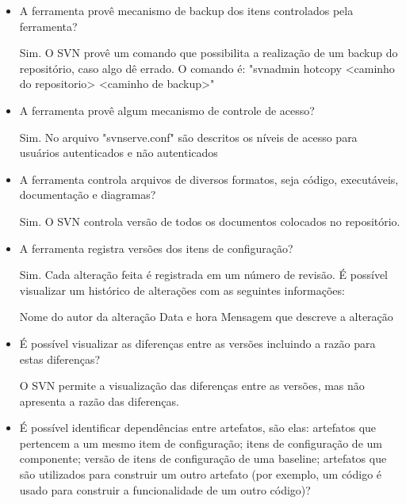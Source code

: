 \begin{itemize}
  \item A ferramenta provê mecanismo de backup dos itens controlados pela ferramenta?

    Sim. O SVN provê um comando que possibilita a realização de um backup do repositório, caso algo dê errado. O comando é:
    "svnadmin hotcopy <caminho do repositorio> <caminho de backup>"

  \item A ferramenta provê algum mecanismo de controle de acesso?
  
    Sim. No arquivo "svnserve.conf" são descritos os níveis de acesso para usuários autenticados e não autenticados

  \item A ferramenta controla arquivos de diversos formatos, seja código, executáveis, documentação e diagramas?
  
    Sim. O SVN controla versão de todos os documentos colocados no repositório.

  \item A ferramenta registra versões dos itens de configuração?
  
    Sim. Cada alteração feita é registrada em um número de revisão. É possível visualizar um histórico de alterações com as seguintes informações:

    \subitem Nome do autor da alteração
    \subitem Data e hora
    \subitem Mensagem que descreve a alteração

  \item É possível visualizar as diferenças entre as versões incluindo a razão para estas 
  diferenças?
  
  O SVN permite a visualização das diferenças entre as versões, mas não apresenta a razão das diferenças.
  
  \item É possível identificar dependências entre artefatos, são elas: artefatos que pertencem a um mesmo item de configuração; itens de configuração de um componente; versão de itens de configuração de uma baseline; artefatos que são utilizados para construir um outro artefato  (por exemplo, um código é usado para construir a funcionalidade de um outro código)?
  

\end{itemize}
